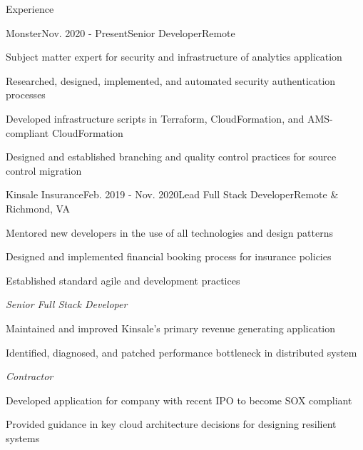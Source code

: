 \documentclass{resume} %
\begin{document}

\begin{rSection}{Experience}

	\begin{rSubsection}{Monster}{Nov. 2020 - Present}{\vspace{-0.5em}Senior Developer}{Remote}
		\item Subject matter expert for security and infrastructure of analytics application
		\item Researched, designed, implemented, and automated security authentication processes
		\item Developed infrastructure scripts in Terraform, CloudFormation, and AMS-compliant CloudFormation
		\item Designed and established branching and quality control practices for source control migration
	\end{rSubsection}

	\begin{rSubsection}{Kinsale Insurance}{Feb. 2019 - Nov. 2020}{\vspace{-0.5em}Lead Full Stack Developer}{Remote \& Richmond, VA}
			\item Mentored new developers in the use of all technologies and design patterns
			\item Designed and implemented financial booking process for insurance policies
			\item Established standard agile and development practices

	    \vspace{-0.5em}\setlength{\itemindent}{.0in}\emph{Senior Full Stack Developer}
	    	\item Maintained and improved Kinsale's primary revenue generating application
			\item Identified, diagnosed, and patched performance bottleneck in distributed system

		\vspace{-0.5em}\setlength{\itemindent}{.0in}\emph{Contractor}
			\item Developed application for company with recent IPO to become SOX compliant
			\item Provided guidance in key cloud architecture decisions for designing resilient systems


	\end{rSubsection}



\end{rSection}
\end{document}
